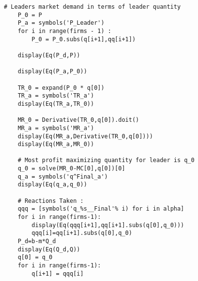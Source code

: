 \begin{lstlisting}[frame=single]
    # Leaders market demand in terms of leader quantity
    P_0 = P 
    P_a = symbols('P_Leader')
    for i in range(firms - 1) :
        P_0 = P_0.subs(q[i+1],qq[i+1])
    
    display(Eq(P_d,P))
    
    display(Eq(P_a,P_0))
    
    TR_0 = expand(P_0 * q[0])
    TR_a = symbols('TR_a')
    display(Eq(TR_a,TR_0))
    
    MR_0 = Derivative(TR_0,q[0]).doit()
    MR_a = symbols('MR_a')
    display(Eq(MR_a,Derivative(TR_0,q[0])))
    display(Eq(MR_a,MR_0))
    
    # Most profit maximizing quantity for leader is q_0
    q_0 = solve(MR_0-MC[0],q[0])[0]
    q_a = symbols('q^Final_a')
    display(Eq(q_a,q_0))
    
    # Reactions Taken :
    qqq = [symbols('q_%s__Final'% i) for i in alpha]
    for i in range(firms-1):
        display(Eq(qqq[i+1],qq[i+1].subs(q[0],q_0)))
        qqq[i]=qq[i+1].subs(q[0],q_0)
    P_d=b-m*Q_d
    display(Eq(Q_d,Q))
    q[0] = q_0
    for i in range(firms-1):
        q[i+1] = qqq[i]

\end{lstlisting}